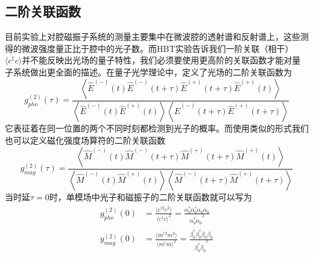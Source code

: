 \subsection{二阶关联函数}
目前实验上对腔磁振子系统的测量主要集中在微波腔的透射谱和反射谱上，这些测得的微波强度量正比于腔中的光子数\cite{harder2016study}。而HBT实验告诉我们一阶关联（相干）$\langle c^{\dag}c \rangle$并不能反映出光场的量子特性，我们必须要使用更高阶的关联函数才能对量子系统做出更全面的描述。在量子光学理论中，定义了光场的二阶关联函数为\cite{gerry2005introductory}
\begin{equation}
g^{(2)}_{pho}(\tau)=\frac{\left\langle\hat{E}^{(-)}(t) \hat{E}^{(-)}(t+\tau) \hat{E}^{(+)}(t+\tau) \hat{E}^{(+)}(t)\right\rangle}{\left\langle\hat{E}^{(-)}(t) \hat{E}^{(+)}(t)\right\rangle\left\langle\hat{E}^{(-)}(t+\tau) \hat{E}^{(+)}(t+\tau)\right\rangle}
\end{equation}
它表征着在同一位置的两个不同时刻都检测到光子的概率。而使用类似的形式我们也可以定义磁化强度场算符的二阶关联函数
\begin{equation}
g^{(2)}_{mag}(\tau)=\frac{\left\langle\hat{M}^{(-)}(t) \hat{M}^{(-)}(t+\tau) \hat{M}^{(+)}(t+\tau) \hat{M}^{(+)}(t)\right\rangle}{\left\langle\hat{M}^{(-)}(t) \hat{M}^{(+)}(t)\right\rangle\left\langle\hat{M}^{(-)}(t+\tau) \hat{M}^{(+)}(t+\tau)\right\rangle}
\end{equation}
当时延$\tau=0$时，单模场中光子和磁振子的二阶关联函数就可以写为
\begin{align}
g_{pho}^{(2)}(0) & = \frac{\langle c^{\dag2}c^2\rangle}{\langle c^{\dag}c\rangle^2} =\frac{\overline{\alpha_{0}^{*}\alpha_{0}^{*}\alpha_{0}\alpha_{0}}}{\overline{\alpha_{0}^{*}\alpha_{0}}^2} \\
g_{mag}^{(2)}(0) & =\frac{\langle m^{\dag2}m^2\rangle}{\langle m^{\dag}m\rangle^2} =\frac{\overline{\beta_{0}^{*}\beta_{0}^{*}\beta_{0}\beta_{0}}}{\overline{\beta_{0}^{*}\beta_{0}}^2}
\end{align}

